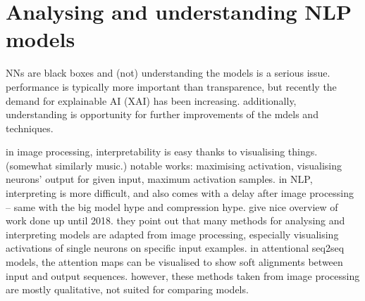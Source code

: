 \documentclass[bsc,frontabs,twoside,singlespacing,parskip,deptreport]{infthesis}
\begin{document}
{  \section{Analysing and understanding NLP models}{
    NNs are black boxes and (not) understanding the models is a serious issue.
    performance is typically more important than transparence, but recently the demand for explainable AI (XAI) has been increasing. additionally, understanding is opportunity for further improvements of the mdels and techniques.

    in image processing, interpretability is easy thanks to visualising things. (somewhat similarly music.) notable works: maximising activation, visualising neurons' output for given input, maximum activation samples.
    in NLP, interpreting is more difficult, and also comes with a delay after image processing -- same with the big model hype and compression hype.
    \citet{Belinkov_2018} give nice overview of work done up until 2018. they point out that many methods for analysing and interpreting models are adapted from image processing, especially visualising activations of single neurons on specific input examples. in attentional seq2seq models, the attention maps can be visualised to show soft alignments between input and output sequences. however, these methods taken from image processing are mostly qualitative, not suited for comparing models.
    
}}
\end{document}
